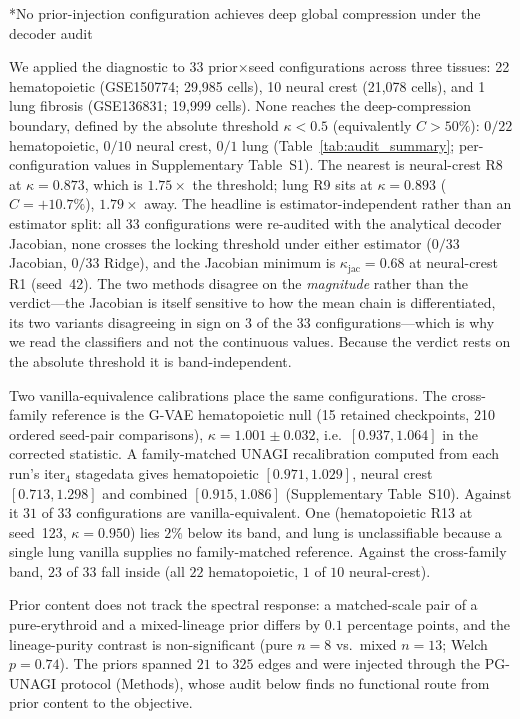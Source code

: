 \documentclass[11pt,a4paper]{article}
\makeatletter
\renewcommand{\subsection}{\@startsection{subsection}{2}{0pt}{10pt plus 4pt}{4pt}{\normalsize\bfseries}}
\makeatother
\begin{document}
\subsection*{No prior-injection configuration achieves deep global compression under the decoder audit}

We applied the diagnostic to 33 prior$\times$seed configurations across three tissues: 22 hematopoietic (GSE150774; 29,985 cells), 10 neural crest (21,078 cells), and 1 lung fibrosis (GSE136831; 19,999 cells). None reaches the deep-compression boundary, defined by the absolute threshold $\kappa<0.5$ (equivalently $C>50\%$): $0/22$ hematopoietic, $0/10$ neural crest, $0/1$ lung (Table~\ref{tab:audit_summary}; per-configuration values in Supplementary Table~S1). The nearest is neural-crest R8 at $\kappa=0.873$, which is $1.75\times$ the threshold; lung R9 sits at $\kappa=0.893$ ($C=+10.7\%$), $1.79\times$ away. The headline is estimator-independent rather than an estimator split: all 33 configurations were re-audited with the analytical decoder Jacobian, none crosses the locking threshold under either estimator ($0/33$ Jacobian, $0/33$ Ridge), and the Jacobian minimum is $\kappa_{\mathrm{jac}}=0.68$ at neural-crest R1 (seed~42). The two methods disagree on the \emph{magnitude} rather than the verdict---the Jacobian is itself sensitive to how the mean chain is differentiated, its two variants disagreeing in sign on 3 of the 33 configurations---which is why we read the classifiers and not the continuous values. Because the verdict rests on the absolute threshold it is band-independent.

Two vanilla-equivalence calibrations place the same configurations. The cross-family reference is the G-VAE hematopoietic null (15 retained checkpoints, 210 ordered seed-pair comparisons), $\kappa=1.001\pm0.032$, i.e.\ $[0.937,1.064]$ in the corrected statistic. A family-matched UNAGI recalibration computed from each run's iter$_4$ stagedata gives hematopoietic $[0.971,1.029]$, neural crest $[0.713,1.298]$ and combined $[0.915,1.086]$ (Supplementary Table~S10). Against it $31$ of $33$ configurations are vanilla-equivalent. One (hematopoietic R13 at seed~123, $\kappa=0.950$) lies $2\%$ below its band, and lung is unclassifiable because a single lung vanilla supplies no family-matched reference. Against the cross-family band, $23$ of $33$ fall inside (all $22$ hematopoietic, $1$ of $10$ neural-crest).

Prior content does not track the spectral response: a matched-scale pair of a pure-erythroid and a mixed-lineage prior differs by $0.1$ percentage points, and the lineage-purity contrast is non-significant (pure $n=8$ vs.\ mixed $n=13$; Welch $p=0.74$). The priors spanned $21$ to $325$ edges and were injected through the PG-UNAGI protocol (Methods), whose audit below finds no functional route from prior content to the objective.
\end{document}

